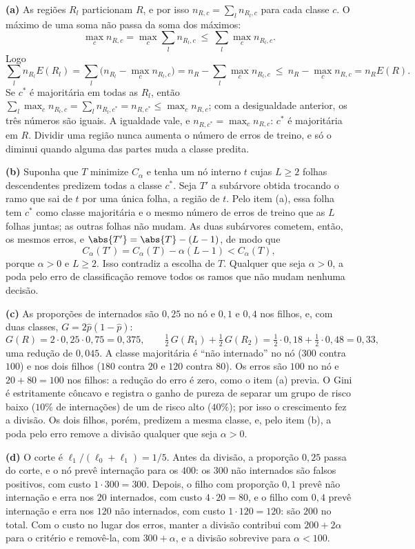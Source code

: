 \begin{solucao}
\textbf{(a)} As regiões $R_l$ particionam $R$, e por isso $n_{R,c}=\sum_ln_{R_l,c}$ para
cada classe $c$. O máximo de uma soma não passa da soma dos máximos:
\[
  \max_cn_{R,c}=\max_c\sum_ln_{R_l,c}\ \le\ \sum_l\max_cn_{R_l,c} .
\]
Logo
\[
  \sum_ln_{R_l}E(R_l)=\sum_l\Big(n_{R_l}-\max_cn_{R_l,c}\Big)=n_R-\sum_l\max_cn_{R_l,c}
  \ \le\ n_R-\max_cn_{R,c}=n_RE(R).
\]
Se $c^*$ é majoritária em todas as $R_l$, então
$\sum_l\max_cn_{R_l,c}=\sum_ln_{R_l,c^*}=n_{R,c^*}\le\max_cn_{R,c}$; com a desigualdade
anterior, os três números são iguais. A igualdade vale, e $n_{R,c^*}=\max_cn_{R,c}$: $c^*$ é
majoritária em $R$. Dividir uma região nunca aumenta o número de erros de treino, e só o
diminui quando alguma das partes muda a classe predita.

\smallskip
\textbf{(b)} Suponha que $T$ minimize $C_\alpha$ e tenha um nó interno $t$ cujas
$L\ge2$ folhas descendentes predizem todas a classe $c^*$. Seja $T'$ a subárvore obtida
trocando o ramo que sai de $t$ por uma única folha, a região de $t$. Pelo item (a), essa folha
tem $c^*$ como classe majoritária e o mesmo número de erros de treino que as $L$ folhas
juntas; as outras folhas não mudam. As duas subárvores cometem, então, os mesmos erros, e
$\abs{T'}=\abs{T}-(L-1)$, de modo que
\[
  C_\alpha(T')=C_\alpha(T)-\alpha(L-1)<C_\alpha(T),
\]
porque $\alpha>0$ e $L\ge2$. Isso contradiz a escolha de $T$. Qualquer que seja $\alpha>0$, a
poda pelo erro de classificação remove todos os ramos que não mudam nenhuma decisão.

\smallskip
\textbf{(c)} As proporções de internados são $0{,}25$ no nó e $0{,}1$ e $0{,}4$ nos filhos, e, com
duas classes, $G=2\widehat p(1-\widehat p)$:
\[
  G(R)=2\cdot0{,}25\cdot0{,}75=0{,}375,
  \qquad
  \tfrac12\,G(R_1)+\tfrac12\,G(R_2)=\tfrac12\cdot0{,}18+\tfrac12\cdot0{,}48=0{,}33 ,
\]
uma redução de $0{,}045$. A classe majoritária é ``não internado'' no nó ($300$ contra $100$) e
nos dois filhos ($180$ contra $20$ e $120$ contra $80$). Os erros são $100$ no nó e
$20+80=100$ nos filhos: a redução do erro é zero, como o item (a) previa. O Gini é
estritamente côncavo e registra o ganho de pureza de separar um grupo de risco baixo
($10\%$ de internações) de um de risco alto ($40\%$); por isso o crescimento fez a divisão. Os
dois filhos, porém, predizem a mesma classe, e, pelo item (b), a poda pelo erro remove a
divisão qualquer que seja $\alpha>0$.

\smallskip
\textbf{(d)} O corte é $\ell_1/(\ell_0+\ell_1)=1/5$. Antes da divisão, a proporção $0{,}25$
passa do corte, e o nó prevê internação para os $400$: os $300$ não internados são falsos
positivos, com custo $1\cdot300=300$. Depois, o filho com proporção $0{,}1$ prevê não internação
e erra nos $20$ internados, com custo $4\cdot20=80$, e o filho com $0{,}4$ prevê internação e erra
nos $120$ não internados, com custo $1\cdot120=120$: são $200$ no total. Com o custo no lugar
dos erros, manter a divisão contribui com $200+2\alpha$ para o critério e removê-la, com
$300+\alpha$, e a divisão sobrevive para $\alpha<100$.


\end{solucao}
